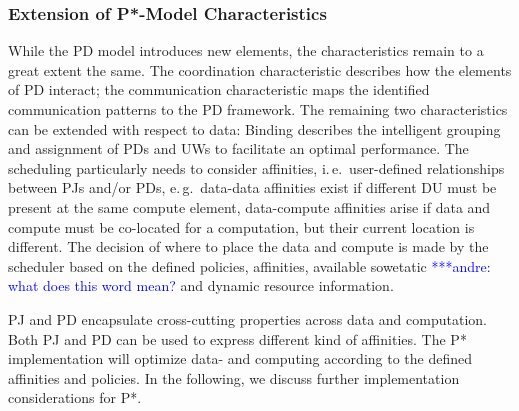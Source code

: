 \documentclass[conference,final]{IEEEtran}
\newcommand{\jhanote}[1]{ {\textcolor{red} { ***shantenu: #1 }}}
\newcommand{\alnote}[1]{ {\textcolor{blue} { ***andre: #1 }}}
\newcommand{\alnote}[1]{}
\newcommand{\jhanote}[1]{}
\begin{document}

\subsubsection*{Extension of P*-Model Characteristics}


While the PD model introduces new elements, the characteristics remain to a
great extent the same. The coordination characteristic describes how the
elements of PD interact; the communication characteristic maps the identified
communication patterns to the PD framework. The remaining two characteristics
can be extended with respect to data: Binding describes the intelligent grouping
and assignment of PDs and UWs to facilitate an optimal performance. The
scheduling particularly needs to consider affinities, i.\,e.\ user-defined
relationships between PJs and/or PDs, e.\,g.\ data-data affinities exist if
different DU must be present at the same compute element, data-compute
affinities arise if data and compute must be co-located for a computation, but
their current location is different. The decision of where to place the data and
compute is made by the scheduler based on the defined policies, affinities,
available sowetatic \alnote{what does this word mean?} and dynamic resource information.


PJ and PD encapsulate cross-cutting properties across data and
computation. Both PJ and PD can be used to express different kind of
affinities.  The P* implementation will optimize data- and computing
according to the defined affinities and policies. In the following, we
discuss further implementation considerations for P*.
\end{document}
